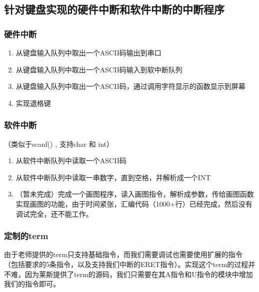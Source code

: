 \subsection{针对键盘实现的硬件中断和软件中断的中断程序}

\subsubsection{硬件中断}

\begin{enumerate}
    \item 从键盘输入队列中取出一个ASCII码输出到串口
    \item 从键盘输入队列中取出一个ASCII码输入到软中断队列
    \item 从键盘输入队列中取出一个ASCII码，通过调用字符显示的函数显示到屏幕
    \item 实现退格键
\end{enumerate}

\subsubsection{软件中断}

（类似于scanf()  ,  支持char 和 int）
\begin{enumerate}
    \item 从软件中断队列中读取一个ASCII码
    \item 从软件中断队列中读取一串数字，直到空格，并解析成一个INT
    \item （暂未完成）完成一个画图程序，读入画图指令，解析成参数，传给画图函数实现画图的功能，由于时间紧张，汇编代码（1000+行）已经完成，然后没有调试完全，还不能工作。
\end{enumerate}

\subsubsection{定制的term}

由于老师提供的term只支持基础指令，而我们需要调试也需要使用扩展的指令（包括要求的5条指令，以及支持我们中断的ERET指令）。实现这个term的过程并不难，因为莱斯提供了term的源码，我们只需要在其A指令和U指令的模块中增加我们的指令即可。


